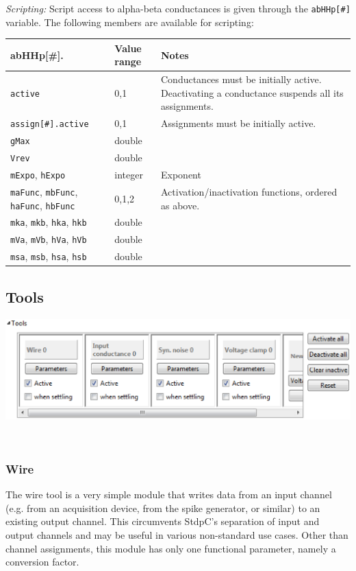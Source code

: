 \documentclass{article}
\begin{document}
\noindent
\emph{Scripting:} Script access to alpha-beta conductances is given through the \texttt{abHHp[\#]} variable.
The following members are available for scripting: \\
\begin{tabularx}{\linewidth}{|ll|X|}
	\hline
	{\bf abHHp[\#].\textvisiblespace} & {\bf Value range} & {\bf Notes} \\
	\hline
	\texttt{active} & 0,1 & Conductances must be initially active. Deactivating a conductance suspends all
	its assignments. \\
	\texttt{assign[\#].active} & 0,1 & Assignments must be initially active. \\
	\texttt{gMax} & double & \\
	\texttt{Vrev} & double & \\
	\texttt{mExpo}, \texttt{hExpo} & integer & Exponent \\
	\texttt{maFunc}, \texttt{mbFunc}, \texttt{haFunc}, \texttt{hbFunc} & 0,1,2 & Activation/inactivation 
	functions, ordered as above. \\
	\texttt{mka}, \texttt{mkb}, \texttt{hka}, \texttt{hkb} & double & \\
	\texttt{mVa}, \texttt{mVb}, \texttt{hVa}, \texttt{hVb} & double & \\
	\texttt{msa}, \texttt{msb}, \texttt{hsa}, \texttt{hsb} & double & \\
	\hline
\end{tabularx}


\subsection{Tools}

\noindent
\parbox{\textwidth}{
	\includegraphics[scale=0.6]{tools}
} \\[0.2cm]

\subsubsection{Wire}
The wire tool is a very simple module that writes data from an input channel (e.g. from an acquisition
device, from the spike generator, or similar) to an existing output channel. This circumvents StdpC's
separation of input and output channels and may be useful in various non-standard use cases.
Other than channel assignments, this module has only one functional parameter, namely a conversion factor.
\end{document}

